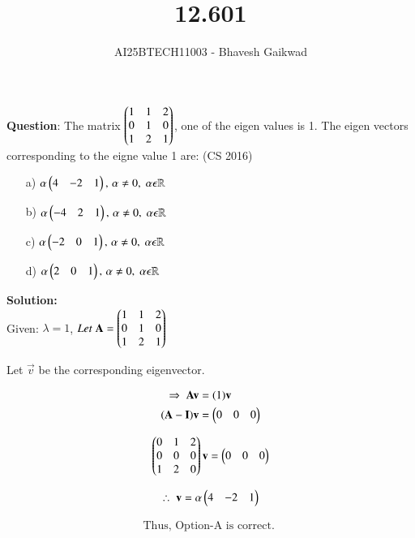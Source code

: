 \documentclass[journal]{IEEEtran}
\begin{document}

\vspace{3cm}

\title{12.601}
\author{AI25BTECH11003 - Bhavesh Gaikwad}
{\let\newpage\relax\maketitle}

\renewcommand{\thefigure}{\theenumi}
\renewcommand{\thetable}{\theenumi}
\setlength{\intextsep}{10pt} 

\renewcommand{\thetable}{\theenumi}


\textbf{Question}: 
The matrix $\begin{pmatrix}1 & 1 & 2 \\ 0 & 1 & 0 \\ 1 & 2 & 1\end{pmatrix}$, one of the eigen values is 1. The eigen vectors corresponding to the eigne value 1 are:
\hfill{(CS 2016)}\\

\begin{itemize}
    \item[a)] $\alpha\begin{pmatrix}4 & -2 & 1\end{pmatrix}, \, \alpha \neq 0, \; \alpha \epsilon \mathbb{R}$
    \item[b)] $\alpha\begin{pmatrix}-4 & 2 & 1\end{pmatrix}, \, \alpha \neq 0, \; \alpha \epsilon \mathbb{R}$
    \item[c)]$\alpha\begin{pmatrix}-2 & 0 & 1\end{pmatrix}, \, \alpha \neq 0, \; \alpha \epsilon \mathbb{R}$
    \item[d)]$\alpha\begin{pmatrix}2 & 0 & 1\end{pmatrix}, \, \alpha \neq 0, \; \alpha \epsilon \mathbb{R}$
\end{itemize}

\bigskip
 
\textbf{Solution:}\\
Given: $\lambda = 1$, $Let \; \mathbf{A} = \begin{pmatrix}1 & 1 & 2 \\ 0 & 1 & 0 \\ 1 & 2 & 1\end{pmatrix}$

Let $\vec{v}$ be the corresponding eigenvector.

\begin{align}
    \Rightarrow \; \mathbf{A}\mathbf{v} &= (1)\mathbf{v} \\ 
    (\mathbf{A} - \mathbf{I})\mathbf{v} &= \begin{pmatrix}0 & 0 & 0\end{pmatrix}
\end{align}

\begin{equation}
\begin{pmatrix}0 & 1 & 2 \\ 0 & 0 & 0 \\ 1 & 2 & 0\end{pmatrix}\mathbf{v} = \begin{pmatrix}0 & 0 & 0\end{pmatrix}    
\end{equation}

\begin{equation}
    \therefore \; \mathbf{v} = \alpha \begin{pmatrix}4 & -2 & 1\end{pmatrix} 
\end{equation}

\begin{align*}
    \boxed{\text{Thus, Option-A is correct. }}
\end{align*}
\end{document}
